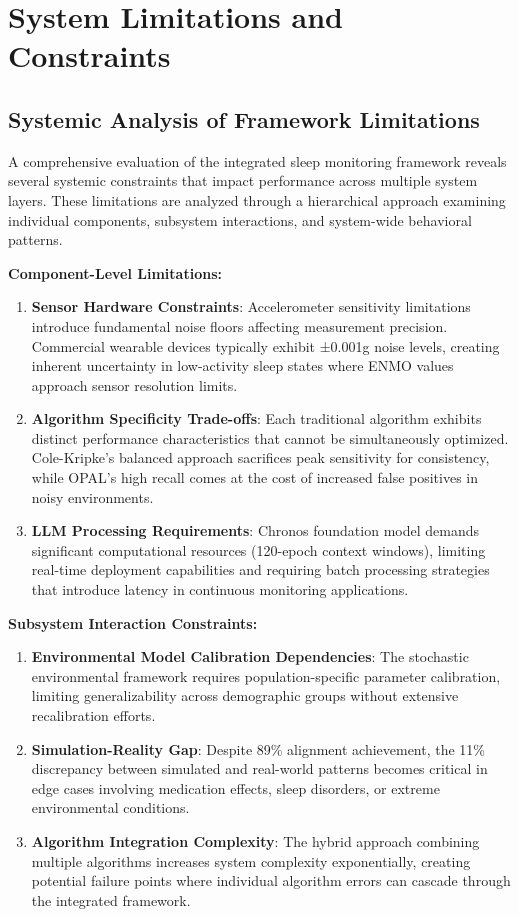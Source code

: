 \documentclass[conference]{IEEEtran}
\begin{document}
\section{System Limitations and Constraints}
\subsection{Systemic Analysis of Framework Limitations}
A comprehensive evaluation of the integrated sleep monitoring framework reveals several systemic constraints that impact performance across multiple system layers. These limitations are analyzed through a hierarchical approach examining individual components, subsystem interactions, and system-wide behavioral patterns.

\textbf{Component-Level Limitations:}
\begin{enumerate}
    \item \textbf{Sensor Hardware Constraints}: Accelerometer sensitivity limitations introduce fundamental noise floors affecting measurement precision. Commercial wearable devices typically exhibit ±0.001g noise levels, creating inherent uncertainty in low-activity sleep states where ENMO values approach sensor resolution limits.
    
    \item \textbf{Algorithm Specificity Trade-offs}: Each traditional algorithm exhibits distinct performance characteristics that cannot be simultaneously optimized. Cole-Kripke's balanced approach sacrifices peak sensitivity for consistency, while OPAL's high recall comes at the cost of increased false positives in noisy environments.
    
    \item \textbf{LLM Processing Requirements}: Chronos foundation model demands significant computational resources (120-epoch context windows), limiting real-time deployment capabilities and requiring batch processing strategies that introduce latency in continuous monitoring applications.
\end{enumerate}

\textbf{Subsystem Interaction Constraints:}
\begin{enumerate}
    \item \textbf{Environmental Model Calibration Dependencies}: The stochastic environmental framework requires population-specific parameter calibration, limiting generalizability across demographic groups without extensive recalibration efforts.
    
    \item \textbf{Simulation-Reality Gap}: Despite 89\% alignment achievement, the 11\% discrepancy between simulated and real-world patterns becomes critical in edge cases involving medication effects, sleep disorders, or extreme environmental conditions.
    
    \item \textbf{Algorithm Integration Complexity}: The hybrid approach combining multiple algorithms increases system complexity exponentially, creating potential failure points where individual algorithm errors can cascade through the integrated framework.
\end{enumerate}
\end{document}
